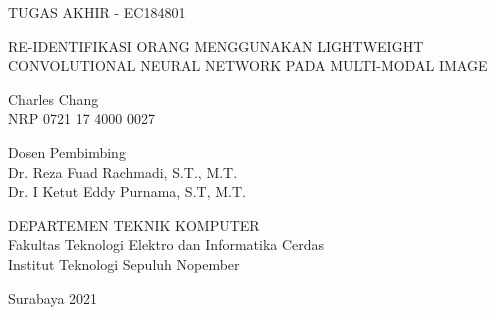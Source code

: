 TUGAS AKHIR - EC184801

\vspace{6ex}

\begin{large}
  RE-IDENTIFIKASI ORANG MENGGUNAKAN LIGHTWEIGHT CONVOLUTIONAL NEURAL NETWORK PADA MULTI-MODAL IMAGE
\end{large}

\vspace{4ex}

Charles Chang \\
NRP 0721 17 4000 0027

\vspace{2ex}

Dosen Pembimbing \\
Dr. Reza Fuad Rachmadi, S.T., M.T. \\
Dr. I Ketut Eddy Purnama, S.T, M.T.

\vspace{6ex}

DEPARTEMEN TEKNIK KOMPUTER \\
Fakultas Teknologi Elektro dan Informatika Cerdas \\
Institut Teknologi Sepuluh Nopember

Surabaya 2021
